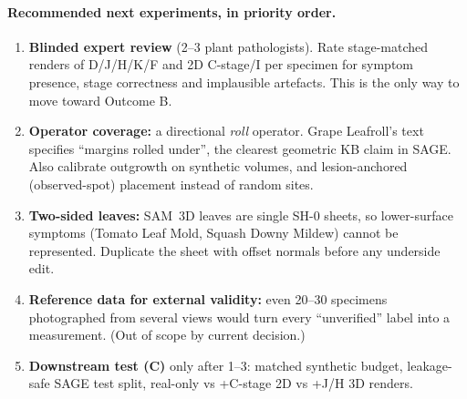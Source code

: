 \paragraph{Recommended next experiments, in priority order.}
\begin{enumerate}
\item \textbf{Blinded expert review} (2--3 plant pathologists). Rate stage-matched renders of D/J/H/K/F and 2D C-stage/I per specimen for symptom presence, stage correctness and implausible artefacts. This is the only way to move toward Outcome B.
\item \textbf{Operator coverage:} a directional \emph{roll} operator. Grape Leafroll's text specifies ``margins rolled under'', the clearest geometric KB claim in SAGE. Also calibrate outgrowth on synthetic volumes, and lesion-anchored (observed-spot) placement instead of random sites.
\item \textbf{Two-sided leaves:} SAM~3D leaves are single SH-0 sheets, so lower-surface symptoms (Tomato Leaf Mold, Squash Downy Mildew) cannot be represented. Duplicate the sheet with offset normals before any underside edit.
\item \textbf{Reference data for external validity:} even 20--30 specimens photographed from several views would turn every ``unverified'' label into a measurement. (Out of scope by current decision.)
\item \textbf{Downstream test (C)} only after 1--3: matched synthetic budget, leakage-safe SAGE test split, real-only vs +C-stage 2D vs +J/H 3D renders.
\end{enumerate}
